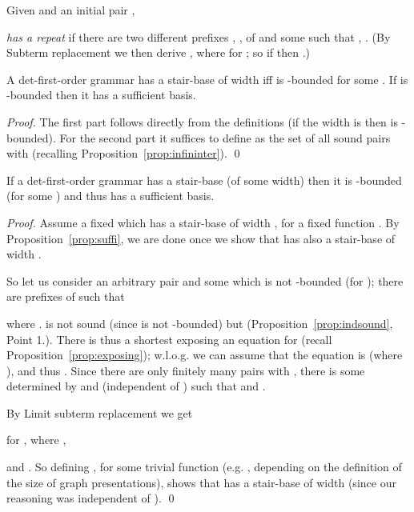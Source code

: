 \documentclass[12pt]{article}
\begin{document}
\begin{defn}\label{def:repeat}
Given  and an initial pair ,

\emph{has a repeat} if there are two
different prefixes , , of   and some  such that 
, .  
(By Subterm replacement we then derive
, where  for
; so if  then
.)
\end{defn}

\begin{prop}\label{prop:suffi}
A det-first-order grammar  has a stair-base of width  
iff  is -bounded for some .
If  is -bounded then it has a sufficient
basis.  
\end{prop}

\begin{proof}
The first part follows directly from the definitions (if the width is  
then  is -bounded).
For the second part it suffices to define  as
the set of all sound pairs  with
 (recalling Proposition~\ref{prop:infininter}).
\qed
\end{proof}



\begin{prop}\label{prop:secondsuf}
If  a det-first-order grammar  has a stair-base (of some width)
then it is -bounded (for some )
and thus
has a sufficient basis.
\end{prop}


\begin{proof}
Assume a fixed  which has a stair-base of width
, for a fixed function .
By Proposition~\ref{prop:suffi}, we are done
once we show
that  has also  a stair-base of width .

So let us consider an arbitrary pair 
and some  which is not -bounded (for
);
there are prefixes  of  such
that 

where . 
 is not sound (since  is not -bounded)
but  
(Proposition~\ref{prop:indsound}, Point 1.).
There is thus a
shortest  exposing an equation for  
(recall Proposition~\ref{prop:exposing}); w.l.o.g. we can assume that
the equation is  (where ), and thus
.
Since there are only finitely many pairs  with
, there is some  determined by 
 and  (independent of ) 
such that  and .

By Limit subterm replacement we get

for , where
, 

and
.
So defining , for some trivial function 
(e.g. , depending on the definition of the size of graph presentations), 
shows that   has a stair-base of width 
(since our reasoning was independent of ).
\qed
\end{proof}
\end{document}
